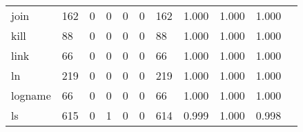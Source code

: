 \begin{longtable}{lp{1.2cm}p{1.2cm}p{1.2cm}p{1.2cm}p{1.2cm}p{1.2cm}p{1.2cm}p{1.2cm}p{1.2cm}p{1.2cm}}
join      &                                   162 &                                                  0 &                                                  0 &                                                  0 &                                                  0 &                                                162 &                                         1.000 &                                              1.000 &                                              1.000 \\
kill      &                                    88 &                                                  0 &                                                  0 &                                                  0 &                                                  0 &                                                 88 &                                         1.000 &                                              1.000 &                                              1.000 \\
link      &                                    66 &                                                  0 &                                                  0 &                                                  0 &                                                  0 &                                                 66 &                                         1.000 &                                              1.000 &                                              1.000 \\
ln        &                                   219 &                                                  0 &                                                  0 &                                                  0 &                                                  0 &                                                219 &                                         1.000 &                                              1.000 &                                              1.000 \\
logname   &                                    66 &                                                  0 &                                                  0 &                                                  0 &                                                  0 &                                                 66 &                                         1.000 &                                              1.000 &                                              1.000 \\
ls        &                                   615 &                                                  0 &                                                  1 &                                                  0 &                                                  0 &                                                614 &                                         0.999 &                                              1.000 &                                              0.998 \\

\end{longtable}
